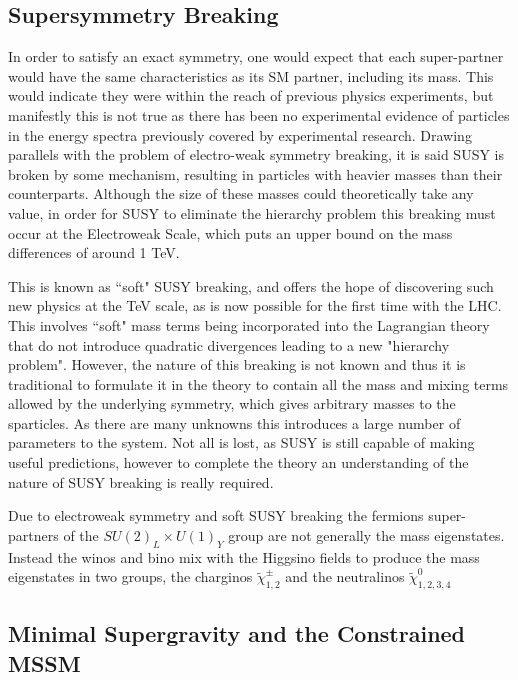 \subsection{Supersymmetry Breaking}

In order to satisfy an exact symmetry, one would expect that each super-partner would have the same characteristics as its SM partner, including its mass. This would indicate they were within the reach of previous physics experiments, but manifestly this is not true as there has been no experimental evidence of particles in the energy spectra previously covered by experimental research. Drawing parallels with the problem of electro-weak symmetry breaking, it is said SUSY is broken by some mechanism, resulting in particles with heavier masses than their counterparts. Although the size of these masses could theoretically take any value, in order for SUSY to eliminate the hierarchy problem this breaking must occur at the Electroweak Scale, which puts an upper bound on the mass differences of around 1 TeV.  

This is known as ``soft" SUSY breaking, and offers the hope of discovering such new physics at the TeV scale, as is now possible for the first time with the LHC. This involves ``soft" mass terms being incorporated into the Lagrangian theory that do not introduce quadratic divergences leading to a new "hierarchy problem". However, the nature of this breaking is not known and thus it is traditional to formulate it in the theory to contain all the mass and mixing terms allowed by the underlying symmetry, which gives arbitrary masses to the sparticles. As there are many unknowns this introduces a large number of parameters to the system. Not all is lost, as SUSY is still capable of making useful predictions, however to complete the theory an understanding of the nature of SUSY breaking is really required. 

Due to electroweak symmetry and soft SUSY breaking the fermions super-partners of the $SU(2)_{L} \times U(1)_{Y}$ group are not generally the mass eigenstates. Instead the winos and bino mix with the Higgsino fields to produce the mass eigenstates in two groups, the charginos $\tilde{\chi}^{\pm}_{1,2}$ and the neutralinos $\tilde{\chi}^{0}_{1,2,3,4}$


\subsection{Minimal Supergravity and the Constrained MSSM}

